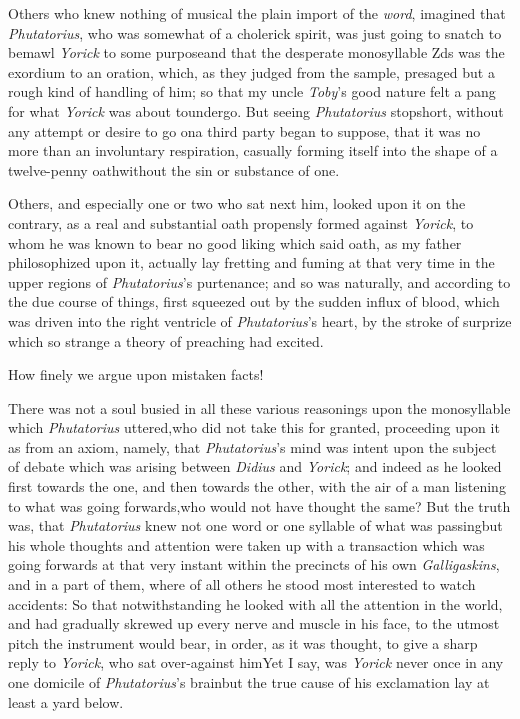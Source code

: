 \documentclass{article}
\begin{document}
Others who knew nothing of musical\break 
{}
the plain import of the \textit{word}, imagined that
\textit{Phutatorius}, who was somewhat of a cholerick spirit, was
just going to snatch  to bemawl \textit{Yorick} to some purpose\tsk and
that the desperate monosyllable Z\tsh ds was the exordium
to an oration, which, as they judged from the sample, presaged but
a rough kind of handling of him;\break 
so that my uncle \textit{Toby}’s good nature felt\break
a pang for what \textit{Yorick} was about to\break undergo. But seeing
\textit{Phutatorius} stop\break short,
without any attempt or desire to go on\tsk a third party began to
suppose,
that it was no more than an involuntary respiration,
casually forming itself into the shape of a twelve-penny
oath\tsk without the sin or substance of one.

Others, and especially one or two who
sat next him, looked upon it on the contrary, 
as a real and substantial oath pro\-pensly 
formed against \textit{Yorick}, to whom
he was known to bear no good liking\tsk\break 
which said oath, as my father philosophized
upon it, actually lay fretting and 
fuming at that very time in the upper 
regions of \textit{Phutatorius}’s purtenance; and
so was naturally, and according to the
due course of things, first squeezed out
by the sudden influx of blood, which
was driven into the right ventricle of 
\textit{Phutatorius}’s heart, by the stroke of surprize 
which so strange a theory of 
preaching had excited.

How finely we argue upon mistaken facts!

There was not a soul busied in all these various reasonings upon
the monosyllable which \textit{Phutatorius} uttered,\tsk who did not
take this for granted, proceeding upon it as from an axiom, namely,
that \textit{Phutatorius}’s mind was intent upon the subject of debate which was arising between
\textit{Didius} and \textit{Yorick}; and indeed as he looked first
towards the one, and then towards the other, with the air of a man
listening to what was going forwards,\tsk who would not have
thought the same? But the truth was, that \textit{Phutatorius} knew
not one word or one syllable of what was passing\tsk but his
whole thoughts and attention were taken up with a transaction which
was going forwards at that very instant within the precincts of his
own \textit{Galligaskins}, and in a part of them, where of all others
he stood most interested to watch accidents: So that
notwithstanding he looked with all the attention in the world, and
had gradually skrewed up every nerve and muscle in his face, to the
utmost pitch the instrument would bear, in order, as it was
thought, to give a sharp reply to \textit{Yorick}, who sat
over-against him\tsk Yet I say, was \textit{Yorick} never
once in any one domicile of \textit{Phutatorius}’s
brain\tsk but the true cause of his exclamation lay at
least a yard below.
\end{document}
